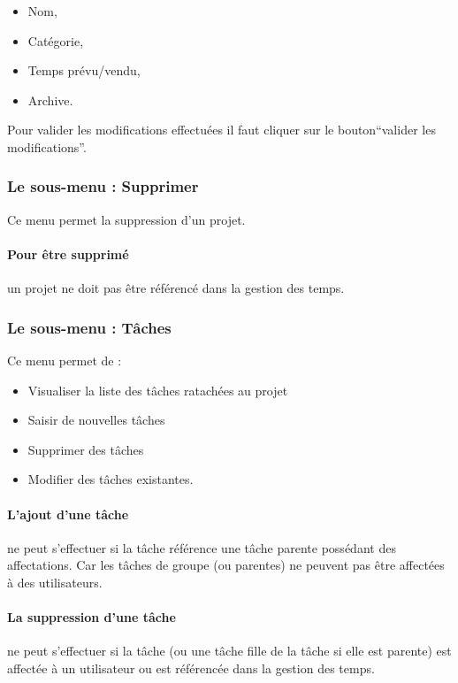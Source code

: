\begin{itemize}
\item Nom,
\item Catégorie,
\item Temps prévu/vendu,
\item Archive.
\end{itemize}

Pour valider les modifications effectuées il faut cliquer sur le bouton``valider les modifications''.


\subsubsection{Le sous-menu : Supprimer}
Ce menu permet la suppression d'un projet.

\paragraph{Pour être supprimé} un projet ne doit pas être référencé dans la gestion des temps.


\subsubsection{Le sous-menu : Tâches}

Ce menu permet de :\\
\begin{itemize}
\item Visualiser la liste des tâches ratachées au projet
\item Saisir de nouvelles tâches
\item Supprimer des tâches
\item Modifier des tâches existantes.
\end{itemize}

\paragraph{L'ajout d'une tâche} ne peut s'effectuer si la tâche référence une tâche parente possédant des affectations. Car les tâches de groupe (ou parentes) ne peuvent pas être affectées à des utilisateurs.

\paragraph{La suppression d'une tâche} ne peut s'effectuer si la tâche (ou une tâche fille de la tâche si elle est parente) est affectée à un utilisateur ou est référencée dans la gestion des temps.

